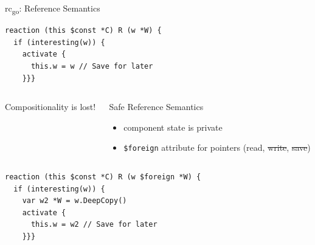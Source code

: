 \documentclass{beamer}
\newcommand{\rcgo}{rc\textsubscript{go}}
\begin{document}
\begin{frame}[fragile]{\rcgo{}:  Reference Semantics}

\begin{lstlisting}
reaction (this $const *C) R (w *W) {
  if (interesting(w)) {
    activate {
      this.w = w // Save for later
    }}}
\end{lstlisting}

\vspace*{-8pt}

\begin{columns}
  \begin{column}{.5\textwidth}
\begin{center}
  Compositionality is lost!
\end{center}
  \end{column}
  \begin{column}{.5\textwidth}
    \begin{block}{Safe Reference Semantics}
      \begin{itemize}
      \item component state is private
      \item \verb+$foreign+ attribute for pointers (read, \sout{write}, \sout{save})
      \end{itemize}
    \end{block}
  \end{column}
\end{columns}

\begin{lstlisting}
reaction (this $const *C) R (w $foreign *W) {
  if (interesting(w)) {
    var w2 *W = w.DeepCopy()
    activate {
      this.w = w2 // Save for later
    }}}
\end{lstlisting}

\end{frame}
\end{document}

